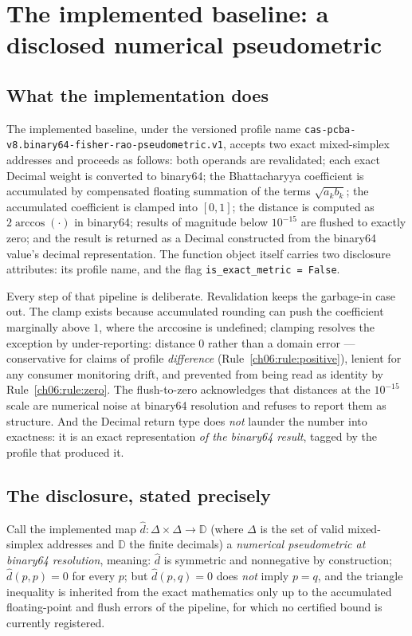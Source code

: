 \section{The implemented baseline: a disclosed numerical pseudometric}
\label{ch06:sec:pseudometric}

\subsection{What the implementation does}

The implemented baseline, under the versioned profile name
\texttt{cas-pcba-v8.binary64-fisher-rao-pseudometric.v1}, accepts two
exact mixed-simplex addresses and proceeds as follows: both operands are
revalidated; each exact Decimal weight is converted to binary64; the
Bhattacharyya coefficient is accumulated by compensated floating
summation of the terms $\sqrt{a_k b_k}$; the accumulated coefficient is
clamped into $[0, 1]$; the distance is computed as
$2 \arccos(\cdot)$ in binary64; results of magnitude below $10^{-15}$
are flushed to exactly zero; and the result is returned as a Decimal
constructed from the binary64 value's decimal representation. The
function object itself carries two disclosure attributes: its profile
name, and the flag \texttt{is\_exact\_metric = False}.

Every step of that pipeline is deliberate. Revalidation keeps the
garbage-in case out. The clamp exists because accumulated rounding can
push the coefficient marginally above $1$, where the arccosine is
undefined; clamping resolves the exception by under-reporting: distance $0$
rather than a domain error --- conservative for claims of profile
\emph{difference} (Rule~\ref{ch06:rule:positive}), lenient for any
consumer monitoring drift, and prevented from being read as identity by
Rule~\ref{ch06:rule:zero}. The flush-to-zero
acknowledges that distances at the $10^{-15}$ scale are numerical noise
at binary64 resolution and refuses to report them as structure. And the
Decimal return type does \emph{not} launder the number into exactness:
it is an exact representation \emph{of the binary64 result}, tagged by
the profile that produced it.

\subsection{The disclosure, stated precisely}

\begin{definition}
\label{ch06:def:pseudometric}
Call the implemented map
$\widehat{d} : \Delta \times \Delta \to \mathbb{D}$ (where $\Delta$ is
the set of valid mixed-simplex addresses and $\mathbb{D}$ the finite
decimals) a \emph{numerical pseudometric at binary64 resolution},
meaning: $\widehat{d}$ is symmetric and nonnegative by construction;
$\widehat{d}(p, p) = 0$ for every $p$; but $\widehat{d}(p, q) = 0$ does
\emph{not} imply $p = q$, and the triangle inequality is inherited from
the exact mathematics only up to the accumulated floating-point and
flush errors of the pipeline, for which no certified bound is currently
registered.
\end{definition}

